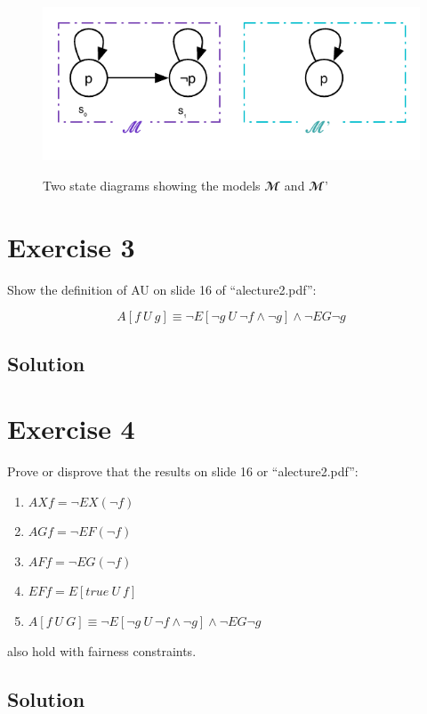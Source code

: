 \documentclass[a4paper, 12pt]{article}
\begin{document}
\begin{figure}[htbp]
    \caption{Two state diagrams showing the models $𝓜$ and $𝓜’$}
    \vskip 0.2cm
    \centering
    \includegraphics[width=1\textwidth]{Figures/State Diagram AGEFp}
    \label{figure:State_Diagram_AGEFp}
\end{figure}

\section{Exercise 3}

Show the definition of AU on slide 16 of “alecture2.pdf”:

\[
    A[f ~U~ g] ≡ ¬E[¬g~U~¬f ∧ ¬g] ∧ ¬EG¬g
\]

\subsection{Solution}



\section{Exercise 4}

Prove or disprove that the results on slide 16 or “alecture2.pdf”:
\begin{enumerate}
    \item $AX f = ¬EX(¬f)$
    \item $AG f = ¬EF(¬f)$
    \item $AF f = ¬EG(¬f)$
    \item $EF f = E[true~U~f]$
    \item $A[f~U~G] ≡ ¬E[¬g~U~¬f ∧ ¬g] ∧ ¬EG ¬g$
\end{enumerate}
also hold with fairness constraints.

\subsection{Solution}
\end{document}
